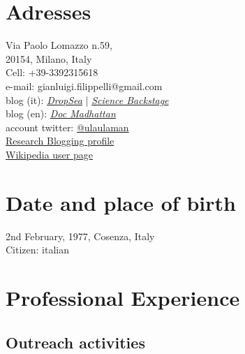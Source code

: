 \section{Adresses}

\begin{flushleft}
	Via Paolo Lomazzo n.59,\\
	20154, Milano, Italy\\ 
	Cell: +39-3392315618\\
	e-mail: gianluigi.filippelli@gmail.com\\
	blog (it): \href{http://dropseaofulaula.blogspot.it/}{\em DropSea} | \href{http://sciencebackstage.blogspot.it/}{\em Science Backstage}\\
	blog (en): \href{http://docmadhattan.fieldofscience.com/}{\em Doc Madhattan}\\
	account twitter: \href{https://twitter.com/ulaulaman}{@ulaulaman}\\
	\href{http://researchblogging.org/blogger/home/id/2181}{Research Blogging profile}\\
	\href{https://it.wikipedia.org/wiki/Utente:Gianluigi}{Wikipedia user page}
\end{flushleft}

\section{Date and place of birth}
\begin{flushleft}
	2nd February, 1977, Cosenza, Italy\\
	Citizen: italian
\end{flushleft}

\section{Professional Experience}
\subsection*{Outreach activities}


